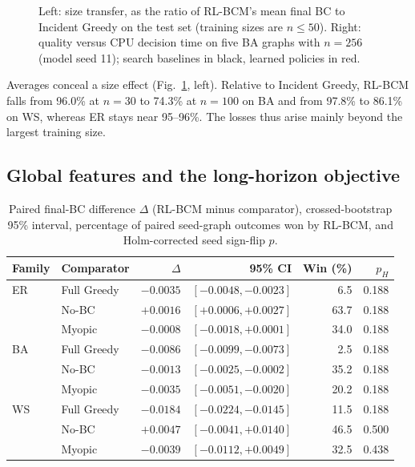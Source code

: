 \documentclass[runningheads]{llncs}
\newcommand{\rlbcm}{RL-BCM}
\begin{document}
\begin{figure}[t]
\caption{Left: size transfer, as the ratio of \rlbcm's mean final BC to
Incident Greedy on the test set (training sizes are $n\le50$). Right:
quality versus CPU decision time on five BA graphs with $n=256$ (model
seed 11); search baselines in black, learned policies in red.}
\label{fig:main}
\end{figure}

Averages conceal a size effect (Fig.~\ref{fig:main}, left). Relative to
Incident Greedy, \rlbcm{} falls from 96.0\% at $n=30$ to 74.3\% at $n=100$
on BA and from 97.8\% to 86.1\% on WS, whereas ER stays near 95--96\%. The
losses thus arise mainly beyond the largest training size.

\subsection{Global features and the long-horizon objective}
\begin{table}[t]
\centering
\caption{Paired final-BC difference $\Delta$ (\rlbcm{} minus comparator),
crossed-bootstrap 95\% interval, percentage of paired seed-graph outcomes
won by \rlbcm, and Holm-corrected seed sign-flip $p$.}
\label{tab:contrasts}
\small
\setlength{\tabcolsep}{4pt}
\begin{tabular}{llrrrr}
\toprule
Family & Comparator & $\Delta$ & 95\% CI & Win (\%) & $p_H$ \\
\midrule
ER & Full Greedy & $-0.0035$ & $[-0.0048, -0.0023]$ & 6.5 & 0.188 \\
   & No-BC       & $+0.0016$ & $[+0.0006, +0.0027]$ & 63.7 & 0.188 \\
   & Myopic      & $-0.0008$ & $[-0.0018, +0.0001]$ & 34.0 & 0.188 \\
\midrule
BA & Full Greedy & $-0.0086$ & $[-0.0099, -0.0073]$ & 2.5 & 0.188 \\
   & No-BC       & $-0.0013$ & $[-0.0025, -0.0002]$ & 35.2 & 0.188 \\
   & Myopic      & $-0.0035$ & $[-0.0051, -0.0020]$ & 20.2 & 0.188 \\
\midrule
WS & Full Greedy & $-0.0184$ & $[-0.0224, -0.0145]$ & 11.5 & 0.188 \\
   & No-BC       & $+0.0047$ & $[-0.0041, +0.0140]$ & 46.5 & 0.500 \\
   & Myopic      & $-0.0039$ & $[-0.0112, +0.0049]$ & 32.5 & 0.438 \\
\bottomrule
\end{tabular}
\end{table}
\end{document}
